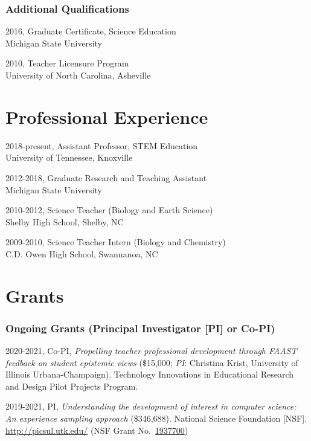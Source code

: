\documentclass[
  11pt,
]{article}
\begin{document}
\hypertarget{additional-qualifications}{%
\subsubsection{Additional
Qualifications}\label{additional-qualifications}}

2016, Graduate Certificate, Science Education\\
Michigan State University

2010, Teacher Licensure Program\\
University of North Carolina, Asheville

\hypertarget{professional-experience}{%
\section{Professional Experience}\label{professional-experience}}

2018-present, Assistant Professor, STEM Education\\
University of Tennessee, Knoxville

2012-2018, Graduate Research and Teaching Assistant\\
Michigan State University

2010-2012, Science Teacher (Biology and Earth Science)\\
Shelby High School, Shelby, NC

2009-2010, Science Teacher Intern (Biology and Chemistry)\\
C.D. Owen High School, Swannanoa, NC

\hypertarget{grants}{%
\section{Grants}\label{grants}}

\hypertarget{ongoing-grants-principal-investigator-pi-or-co-pi}{%
\subsubsection{Ongoing Grants (Principal Investigator {[}PI{]} or
Co-PI)}\label{ongoing-grants-principal-investigator-pi-or-co-pi}}

2020-2021, Co-PI, \emph{Propelling teacher professional development
through FAAST feedback on student epistemic views} (\$15,000; \emph{PI}:
Christina Krist, University of Illinois Urbana-Champaign). Technology
Innovations in Educational Research and Design Pilot Projects Program.

2019-2021, PI, \emph{Understanding the development of interest in
computer science: An experience sampling approach} (\$346,688). National
Science Foundation {[}NSF{]}. \url{http://picsul.utk.edu/} (NSF Grant
No.~\href{https://www.nsf.gov/awardsearch/showAward?AWD_ID=1937700\&HistoricalAwards=false}{1937700})
\end{document}
